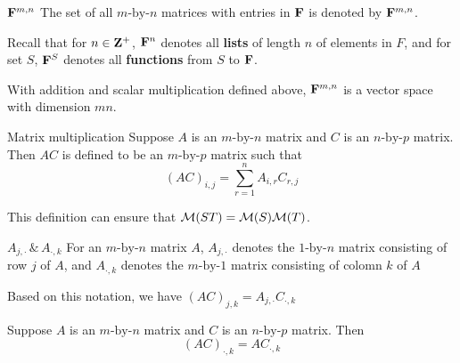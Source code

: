 \documentclass[12pt,a4paper]{article}
\begin{document}
    \begin{notation}{$\mathbf{F}^{m,n}$}
        The set of all $m\text{-by-}n$ matrices with entries in $\mathbf{F}$ is denoted by $\mathbf{F}^{m,n}$.
    \end{notation}
    \begin{remark}
        Recall that for $n\in\mathbf{Z}^+$, $\mathbf{F}^n$ denotes all \textbf{lists} of length $n$ of elements in $F$, and for set $S$, $\mathbf{F}^S$ denotes all \textbf{functions} from $S$ to $\mathbf{F}$.
    \end{remark}
    \hfill

    \begin{prop}\label{3.28}
        With addition and scalar multiplication defined above, $\mathbf{F}^{m,n}$ is a vector space with dimension $mn$.
    \end{prop}
    \hfill

    \begin{defi}{Matrix multiplication}
        Suppose $A$ is an $m\text{-by-}n$ matrix and $C$ is an $n\text{-by-}p$ matrix. Then $AC$ is defined to be an $m\text{-by-}p$ matrix such that
        $$
        (AC)_{i,j}=\sum_{r=1}^nA_{i,r}C_{r,j}
        $$
    \end{defi}
    \begin{remark}
        This definition can ensure that $\mathcal{M}(ST)=\mathcal{M}(S)\mathcal{M}(T)$.
    \end{remark}
    \hfill

    \begin{notation}{$A_{j,\cdot}\,\&\,A_{\cdot,k}$}
    For an $m\text{-by-}n$ matrix $A$, $A_{j,\cdot}$ denotes the $1\text{-by-}n$ matrix consisting of row $j$ of $A$, and $A_{\cdot,k}$ denotes the $m\text{-by-}1$ matrix consisting of colomn $k$ of $A$
    \end{notation}
    \begin{remark}
        Based on this notation, we have $(AC)_{j,k}=A_{j,\cdot}C_{\cdot,k}$
    \end{remark}
    \hfill

    \begin{prop}
        Suppose $A$ is an $m\text{-by-}n$ matrix and $C$ is an $n\text{-by-}p$ matrix. Then
        $$(AC)_{\cdot,k}=AC_{\cdot,k}$$
    \end{prop}
    \hfill
    
\end{document}
